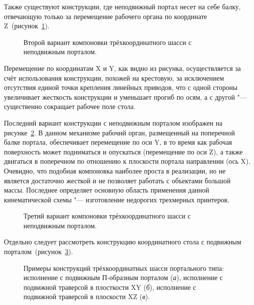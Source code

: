 Также существуют конструкции, где неподвижный портал несет на себе балку, отвечающую только за перемещение рабочего органа по координате Z~(рисунок~\cref{fig:coord-2}).

\begin{figure}[ht]
	\caption{Второй вариант компоновки трёхкоординатного шасси с неподвижным порталом.}\label{fig:coord-2}
\end{figure}

Перемещение по координатам X и Y, как видно из рисунка, осуществляется за счёт использования конструкции, похожей на крестовую, за исключением отсутствия единой точки крепления линейных приводов, что с одной стороны увеличивает жесткость конструкции и уменьшает прогиб по осям, а с другой "--- существенно сокращает рабочее поле стола.

Последний вариант конструкции с неподвижным порталом изображен на рисунке~\cref{fig:coord-3}. В данном механизме рабочий орган, размещенный на поперечной балке портала, обеспечивает перемещение по оси Y, в то время как рабочая поверхность может подниматься и опускаться (перемещение по оси Z), а также двигаться в поперечном по отношению к плоскости портала направлении (ось X). Очевидно, что подобная компоновка наиболее проста в реализации, но не является достаточно жесткой и не позволяет работать с объектами большой массы. Последнее определяет основную область применения данной кинематической схемы "--- изготовление недорогих трехмерных принтеров.

\begin{figure}[ht]
	\caption{Третий вариант компоновки трёхкоординатного шасси с неподвижным порталом.}\label{fig:coord-3}
\end{figure}

Отдельно следует рассмотреть конструкцию координатного стола с подвижным порталом~(рисунок~\cref{fig:move-portal}).

\begin{figure}[ht]
	\caption[Примеры конструкций трёхкоординатных шасси портального типа]%
	{Примеры конструкций трёхкоординатных шасси портального типа: исполнение с подвижным П-образным порталом (\textit{а}), исполнение с подвижной траверсой в плосткости XY  (\textit{б}), исполнение с подвижной траверсой в плоскости XZ (\textit{в}).}\label{fig:move-portal}
\end{figure}

